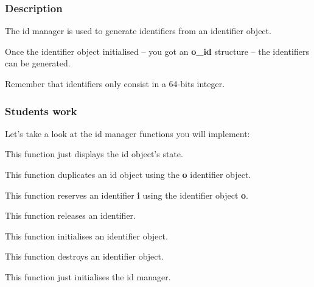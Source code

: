 \subsubsection{Description}

The id manager is used to generate identifiers from an identifier object.

Once the  identifier object initialised  -- you got  an \textbf{o\_id}
structure -- the identifiers can be generated.

Remember that identifiers only consist in a 64-bits integer.

\subsubsection{Students work}

Let's take a look at the id manager functions you will implement:


This function just displays the id object's state.


This function duplicates an id object using the \textbf{o} identifier
object.


This function reserves an identifier \textbf{i} using the identifier
object \textbf{o}.


This function releases an identifier.


This function initialises an identifier object.


This function destroys an identifier object.


This function just initialises the id manager.


